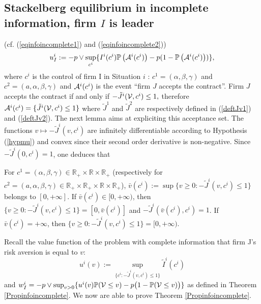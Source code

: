 \documentclass{svjour3}
\begin{document}
\subsection{Stackelberg equilibrium in incomplete information,   firm $I$ is leader}
(cf. (\ref{eqinfoincomplete1}) and  (\ref{eqinfoincomplete2})) 
 \begin{equation}
 \label{**}
u^i_I:=-p\vee\sup_{c^i}\{I^i(c^i){\mathbb{P}}\left({\cal A}^i(c^i)\right)-p(1-{\mathbb{P}}\left({\cal A}^i(c^i)\right))\},
 \end{equation}
where $c^i$ is the control of firm I in Situation $i$ :
$c^1= (\alpha,\beta,\gamma)$ and $c^2= (a, \alpha,\beta,\gamma)$ and ${\cal A}^i(c^i)$ is the event ``firm $J$ accepts the contract''. 
Firm $J$ accepts the contract if and only if $- \tilde J^i({\cal V},c^i)\leq 1,$ 
therefore ${\cal A}^i(c^i)=\{\tilde J^i({\cal V},c^i)\leq 1\}$ where $\tilde J^1$ and $\tilde J^2$ are respectively defined in (\ref{deftJv1}) and  (\ref{deftJv2}). The next lemma  aims at expliciting this acceptance set.
 The functions $v\mapsto -\tilde{J}^i(v,c^i)$ are infinitely differentiable according to Hypothesis (\ref{hypmu}) and convex since their second order derivative is non-negative. Since $- \tilde J^i(0,c^i)=1$, one deduces that
\begin{lemma}
\label{lemacc}
For  $c^1=(\alpha,\beta,\gamma)\in \mathbb{R}_+\times\mathbb{R}\times\mathbb{R}_+$ (respectively for $c^2=(a,\alpha,\beta,\gamma)\in\mathbb{R}_+\times\mathbb{R}_+\times\mathbb{R}\times\mathbb{R}_+$), $\bar v(c^i):=\sup\{v\geq 0:- \tilde J^i(v,c^i)\leq 1\}$ belongs to $[0,+\infty]$. If $\bar v(c^i)\in[0,+\infty)$, then $\{v\geq 0:- \tilde J^i(v,c^i)\leq 1\}=[0,\bar v(c^i)]$ and $- \tilde J^i(\bar v(c^i),c^i)=1$. If $\bar v(c^i)=+\infty$, then $\{v\geq 0:- \tilde J^i(v,c^i)\leq 1\}=[0,+\infty)$.
\end{lemma}

\noindent Recall the value function of the problem with complete information that firm J's risk aversion is equal to $v$:
 $$u^i(v):=\sup_{\{c^i:- \tilde J^i(v,c^i)\leq 1\}}\tilde I^i(c^i)$$
   and  $ w^i_I=-p\vee \sup_{v>0}\{u^i(v){\mathbb{P}}({\cal V}\leq v)-p\big(1-{\mathbb{P}}({\cal V}\leq v)\big)\}$ as defined in Theorem \ref{Propinfoincomplete}.
We now are able to prove Theorem \ref{Propinfoincomplete}.

\vspace{5mm}

\end{document}
